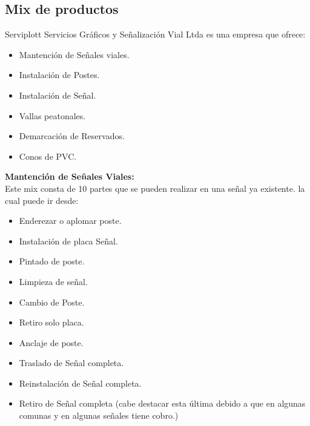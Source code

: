 	\subsection{Mix de productos}
	Serviplott Servicios Gráficos y Señalización Vial Ltda es una empresa que ofrece:
	\begin{itemize}
	\item Mantención de Señales viales.
	\item Instalación de Postes.
	\item Instalación de Señal.
	\item Vallas peatonales. 
	\item Demarcación de Reservados. 
	\item Conos de PVC.
	\end{itemize}
	\textbf{Mantención de Señales Viales:} \\
\vspace{3mm} Este mix consta de 10 partes que se pueden realizar en una señal ya existente. la cual puede ir desde:
	\begin{itemize}
	\item Enderezar o aplomar poste. 
	\item Instalación de placa Señal. 
	\item Pintado de poste.
	\item Limpieza de señal.
	\item Cambio de Poste.
	\item Retiro solo placa.
	\item Anclaje de poste.
	\item Traslado de Señal completa.
	\item Reinstalación de Señal completa.
	\item Retiro de Señal completa (cabe destacar esta última debido a que en algunas 		comunas y en algunas señales tiene cobro.) 
	\end{itemize}
	
